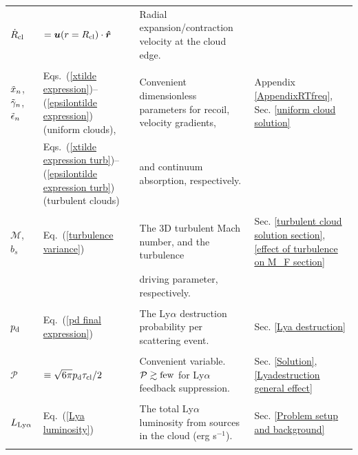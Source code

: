 \documentclass[fleqn,usenatbib]{mnras}
\begin{document}
\begin{table}
\begin{tabular}{l l l l }
    \\

  $\Dot{R}_{\rm cl}$ & $=  \boldsymbol{u}(r = R_{\rm cl}) \cdot \boldsymbol{\hat{r}}$   & Radial expansion/contraction velocity at the cloud edge. &  \\ 


 \\

   $\Tilde{x}_n$, $\Tilde{\gamma}_n$, $\Tilde{\epsilon}_n$  & Eqs.~(\ref{xtilde expression})--(\ref{epsilontilde expression}) (uniform clouds),  & Convenient dimensionless parameters for recoil, velocity gradients, & Appendix \ref{AppendixRTfreq}, Sec. \ref{uniform cloud solution} \\ 

      & Eqs.~(\ref{xtilde expression turb})--(\ref{epsilontilde expression turb}) (turbulent clouds) & and continuum absorption, respectively. &  \\ 

 \\

  $\mathcal{M}$, $b_s$ &  Eq.~(\ref{turbulence variance})  & The 3D turbulent Mach number, and the turbulence & Sec. \ref{turbulent cloud solution section}, \ref{effect of turbulence on M_F section} \\ 

   &   & driving parameter, respectively. &  \\ 


 \\

  $p_{\rm d}$ &  Eq.~(\ref{pd final expression})  & The Ly$\alpha$ destruction probability per scattering event. & Sec. \ref{Lya destruction} \\ 

  \\

  $\mathcal{P}$ &  $\equiv \sqrt{6 \pi} p_{\rm d} \tau_{\rm cl}/2 $  & Convenient variable. $\mathcal{P} \gtrsim \rm few$ for Ly$\alpha$ feedback suppression. & Sec. \ref{Solution}, \ref{Lyadestruction general effect} \\ 

  \\

  $L_{\rm Ly\alpha}$ &  Eq.~(\ref{Lya luminosity})  & The total Ly$\alpha$ luminosity from sources in the cloud (erg s$^{-1}$). & Sec. \ref{Problem setup and background} \\ 

  \\


\end{tabular}
\end{table}
\end{document}
